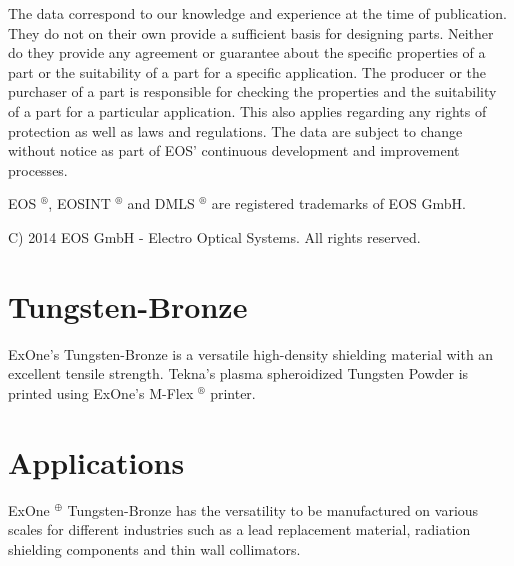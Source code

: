 \documentclass[10pt]{article}
\begin{document}
The data correspond to our knowledge and experience at the time of publication. They do not on their own provide a sufficient basis for designing parts. Neither do they provide any agreement or guarantee about the specific properties of a part or the suitability of a part for a specific application. The producer or the purchaser of a part is responsible for checking the properties and the suitability of a part for a particular application. This also applies regarding any rights of protection as well as laws and regulations. The data are subject to change without notice as part of EOS' continuous development and improvement processes.

EOS $^{\circledR}$, EOSINT $^{\circledR}$ and DMLS ${ }^{\circledR}$ are registered trademarks of EOS GmbH.

C) 2014 EOS GmbH - Electro Optical Systems. All rights reserved.

\section*{Tungsten-Bronze}
ExOne's Tungsten-Bronze is a versatile high-density shielding material with an excellent tensile strength. Tekna's plasma spheroidized Tungsten Powder is printed using ExOne's M-Flex ${ }^{\circledR}$ printer.

\section*{Applications}
ExOne ${ }^{\oplus}$ Tungsten-Bronze has the versatility to be manufactured on various scales for different industries such as a lead replacement material, radiation shielding components and thin wall collimators.
\end{document}
